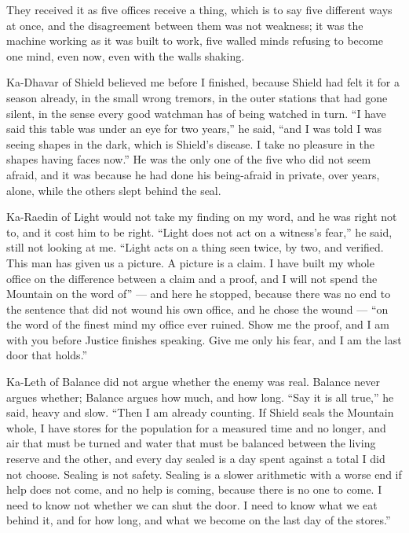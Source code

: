 They received it as five offices receive a thing, which is to say five different ways at once, and the disagreement between them was not weakness; it was the machine working as it was built to work, five walled minds refusing to become one mind, even now, even with the walls shaking.\par

Ka-Dhavar of Shield believed me before I finished, because Shield had felt it for a season already, in the small wrong tremors, in the outer stations that had gone silent, in the sense every good watchman has of being watched in turn. ``I have said this table was under an eye for two years,'' he said, ``and I was told I was seeing shapes in the dark, which is Shield's disease. I take no pleasure in the shapes having faces now.'' He was the only one of the five who did not seem afraid, and it was because he had done his being-afraid in private, over years, alone, while the others slept behind the seal.\par

Ka-Raedin of Light would not take my finding on my word, and he was right not to, and it cost him to be right. ``Light does not act on a witness's fear,'' he said, still not looking at me. ``Light acts on a thing seen twice, by two, and verified. This man has given us a picture. A picture is a claim. I have built my whole office on the difference between a claim and a proof, and I will not spend the Mountain on the word of'' --- and here he stopped, because there was no end to the sentence that did not wound his own office, and he chose the wound --- ``on the word of the finest mind my office ever ruined. Show me the proof, and I am with you before Justice finishes speaking. Give me only his fear, and I am the last door that holds.''\par

Ka-Leth of Balance did not argue whether the enemy was real. Balance never argues whether; Balance argues how much, and how long. ``Say it is all true,'' he said, heavy and slow. ``Then I am already counting. If Shield seals the Mountain whole, I have stores for the population for a measured time and no longer, and air that must be turned and water that must be balanced between the living reserve and the other, and every day sealed is a day spent against a total I did not choose. Sealing is not safety. Sealing is a slower arithmetic with a worse end if help does not come, and no help is coming, because there is no one to come. I need to know not whether we can shut the door. I need to know what we eat behind it, and for how long, and what we become on the last day of the stores.''\par

